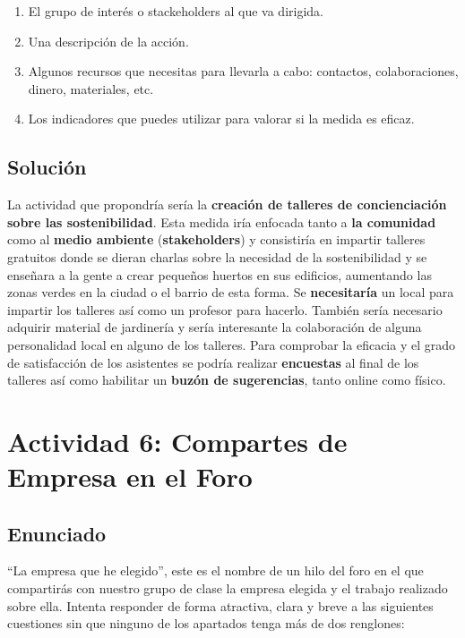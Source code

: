 \begin{enumerate}
    \item El grupo de interés o stackeholders al que va dirigida.
    \item Una descripción de la acción.
    \item Algunos recursos que necesitas para llevarla a cabo: contactos, colaboraciones, dinero, materiales, etc.
    \item Los indicadores que puedes utilizar para valorar si la medida es eficaz.
\end{enumerate}

\subsection{Solución}

La actividad que propondría sería la \textbf{creación de talleres de concienciación sobre las sostenibilidad}. Esta medida iría enfocada tanto a \textbf{la comunidad} como al \textbf{medio ambiente} (\textbf{stakeholders}) y consistiría en impartir talleres gratuitos donde se dieran charlas sobre la necesidad de la sostenibilidad y se enseñara a la gente a crear pequeños huertos en sus edificios, aumentando las zonas verdes en la ciudad o el barrio de esta forma. Se \textbf{necesitaría} un local para impartir los talleres así como un profesor para hacerlo. También sería necesario adquirir material de jardinería y sería interesante la colaboración de alguna personalidad local en alguno de los talleres. Para comprobar la eficacia y el grado de satisfacción de los asistentes se podría realizar \textbf{encuestas} al final de los talleres así como habilitar un \textbf{buzón de sugerencias}, tanto online como físico.

\section{Actividad 6: Compartes de Empresa en el Foro}

\subsection{Enunciado}
“La empresa que he elegido”, este es el nombre de un hilo del foro en el que compartirás con nuestro grupo de clase la empresa elegida y el trabajo realizado sobre ella. Intenta responder de forma atractiva, clara y breve a las siguientes cuestiones sin que ninguno de los apartados tenga más de dos renglones:

